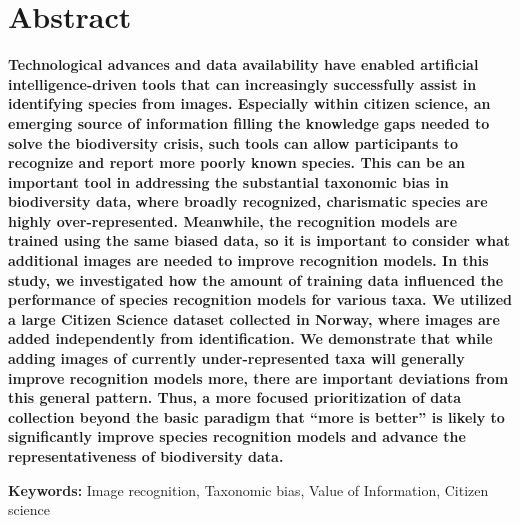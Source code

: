 \documentclass{article}
\begin{document}
\section*{Abstract}
\textbf{Technological advances and data availability have enabled artificial intelligence-driven tools that can increasingly successfully assist in identifying species from images. Especially within citizen science, an emerging source of information filling the knowledge gaps needed to solve the biodiversity crisis, such tools can allow participants to recognize and report more poorly known species. This can be an important tool in addressing the substantial taxonomic bias in biodiversity data, where broadly recognized, charismatic species are highly over-represented. Meanwhile, the recognition models are trained using the same biased data, so it is important to consider what additional images are needed to improve recognition models. In this study, we investigated how the amount of training data influenced the performance of species recognition models for various taxa. We utilized a large Citizen Science dataset collected in Norway, where images are added independently from identification. We demonstrate that while adding images of currently under-represented taxa will generally improve recognition models more, there are important deviations from this general pattern. Thus, a more focused prioritization of data collection beyond the basic paradigm that ``more is better'' is likely to significantly improve species recognition models and advance the representativeness of biodiversity data.}

\vspace{.5cm}
\noindent\textbf{Keywords:} Image recognition, Taxonomic bias, Value of Information, Citizen science
\end{document}
